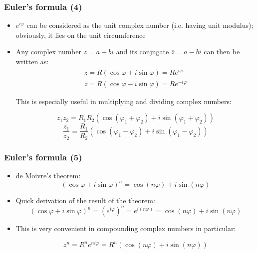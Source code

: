 \documentclass[10pt]{beamer}
\theoremstyle{definition}
\begin{document}
\begin{frame}[fragile]
	\frametitle{Euler's formula (4)}
	\begin{itemize}
		\item $e^{i\varphi}$ can be considered as the unit complex number (i.e. having unit modulus); obviously, it lies on the unit circumference
		\item Any complex number $z = a + bi$ and its conjugate $\overline{z} = a - bi$ can then be written as:
		\[
		\begin{array}{lcl}
			z = R(\cos \varphi + i \sin\varphi) = R e^{i\varphi}\\
			\overline{z} = R(\cos \varphi - i \sin\varphi) = R e^{-i\varphi}
		\end{array}
		\]
		
		This is especially useful in multiplying and dividing complex numbers:
		
		\[
		z_{1}z_{2} = R_{1}R_{2}(\cos(\varphi_{1} + \varphi_{2}) + i\sin(\varphi_{1} + \varphi_{2}))
		\]
		\[
		\frac{z_{1}}{z_{2}} = \frac{R_{1}}{R_{2}}(\cos(\varphi_{1} - \varphi_{2}) + i\sin(\varphi_{1} - \varphi_{2}))
		\]
	\end{itemize}
\end{frame}

\begin{frame}[fragile]
	\frametitle{Euler's formula (5)}
	\begin{itemize}
		\item de Moivre's theorem: 
		\[
		(\cos\varphi + i \sin\varphi)^{n} = \cos (n\varphi) + i \sin(n\varphi)
		\]
		
		\item Quick derivation of the result of the theorem:
		\[
		(\cos\varphi + i \sin\varphi)^{n} = (e^{i\varphi})^{n} = e^{i(n\varphi)} = \cos (n\varphi) + i \sin(n\varphi)
		\]	
		
		\item \noindent This is very convenient in compounding complex numbers in particular:
		
		\[
		z^{n} = R^{n} e^{ni\varphi} = R^{n}(\cos (n\varphi) + i \sin(n\varphi))
		\]
	\end{itemize}
\end{frame}
\end{document}
